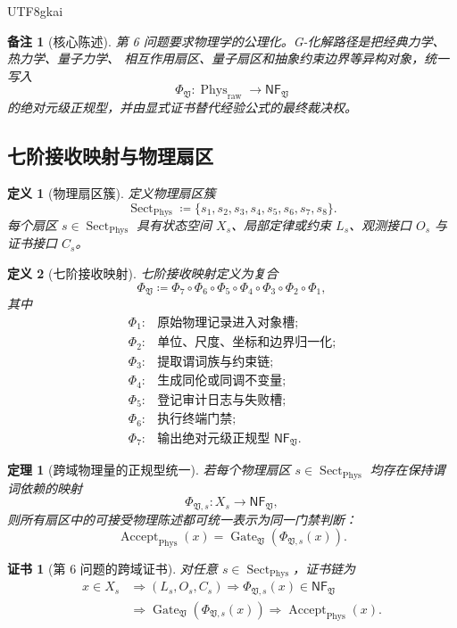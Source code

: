 \documentclass[12pt]{article}
\newtheorem{definition}{定义}[section]
\newtheorem{theorem}{定理}[section]
\newtheorem{remark}{备注}[section]
\newtheorem{Certificate}{证书}[section]
\newcommand{\Vsys}{\mathfrak V}
\newcommand{\NF}{\mathsf{NF}}
\newcommand{\DefEq}{\coloneqq}
\DeclareMathOperator{\Accept}{Accept}
\DeclareMathOperator{\Gate}{Gate}
\DeclareMathOperator{\Phys}{Phys}
\DeclareMathOperator{\Sect}{Sect}
\begin{document}
\begin{CJK*}{UTF8}{gkai}
\begin{remark}[核心陈述]
第 6 问题要求物理学的公理化。G-化解路径是把经典力学、热力学、量子力学、
相互作用扇区、量子扇区和抽象约束边界等异构对象，统一写入
\[
  \Phi_{\Vsys}:\Phys_{\mathrm{raw}}\longrightarrow \NF_{\Vsys}
\]
的绝对元级正规型，并由显式证书替代经验公式的最终裁决权。
\end{remark}

\subsection{七阶接收映射与物理扇区}
\label{subsec:tex59-physics-map}

\begin{definition}[物理扇区簇]
\label{def:tex59-physical-sectors}
定义物理扇区簇
\[
  \Sect_{\Phys}
  \DefEq
  \{
  s_1,s_2,s_3,s_4,s_5,s_6,s_7,s_8
  \}.
\]
每个扇区 \(s\in\Sect_{\Phys}\) 具有状态空间 \(X_s\)、局部定律或约束 \(L_s\)、观测接口
\(O_s\) 与证书接口 \(C_s\)。
\end{definition}

\begin{definition}[七阶接收映射]
\label{def:tex59-seven-map}
七阶接收映射定义为复合
\[
  \Phi_{\Vsys}
  \DefEq
  \Phi_7\circ\Phi_6\circ\Phi_5\circ\Phi_4\circ\Phi_3\circ\Phi_2\circ\Phi_1,
\]
其中
\[
\begin{array}{ll}
\Phi_1:& \text{原始物理记录进入对象槽};\\
\Phi_2:& \text{单位、尺度、坐标和边界归一化};\\
\Phi_3:& \text{提取谓词族与约束链};\\
\Phi_4:& \text{生成同伦或同调不变量};\\
\Phi_5:& \text{登记审计日志与失败槽};\\
\Phi_6:& \text{执行终端门禁};\\
\Phi_7:& \text{输出绝对元级正规型 } \NF_{\Vsys}.
\end{array}
\]
\end{definition}

\begin{theorem}[跨域物理量的正规型统一]
\label{thm:tex59-physical-normal-form}
若每个物理扇区 \(s\in\Sect_{\Phys}\) 均存在保持谓词依赖的映射
\[
  \Phi_{\Vsys,s}:X_s\longrightarrow \NF_{\Vsys},
\]
则所有扇区中的可接受物理陈述都可统一表示为同一门禁判断：
\[
  \Accept_{\Phys}(x)
  =
  \Gate_{\Vsys}(\Phi_{\Vsys,s}(x)).
\]
\end{theorem}

\begin{Certificate}[第 6 问题的跨域证书]
\label{cert:tex59-physics}
对任意 \(s\in\Sect_{\Phys}\)，证书链为
\[
  \begin{aligned}
  x\in X_s
  &\Longrightarrow
  (L_s,O_s,C_s)
  \Longrightarrow
  \Phi_{\Vsys,s}(x)\in\NF_{\Vsys}\\
  &\Longrightarrow
  \Gate_{\Vsys}(\Phi_{\Vsys,s}(x))
  \Longrightarrow
  \Accept_{\Phys}(x).
  \end{aligned}
\]
\end{Certificate}


\end{CJK*}
\end{document}
